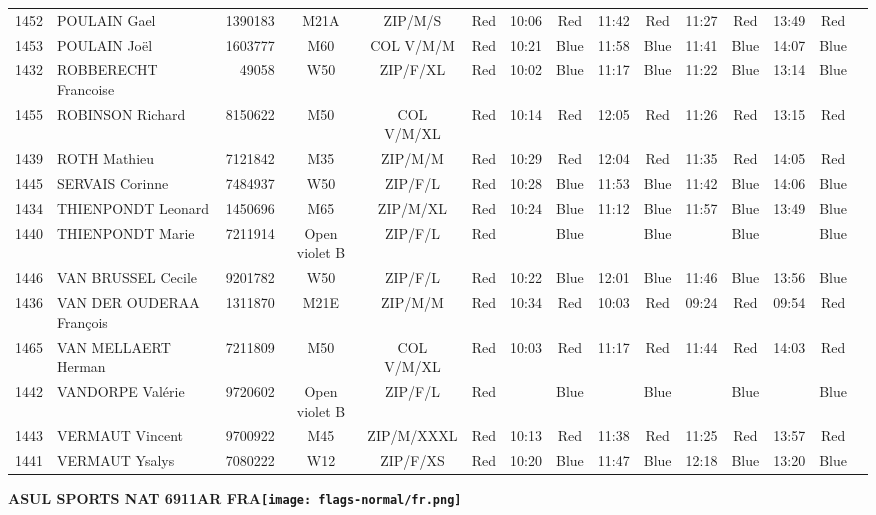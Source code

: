 \documentclass{report}
\begin{document}
\begin{longtable}{|c|l|r|c|c|*{5}{cc|}}
    1452 & POULAIN Gael & 1390183 & M21A & ZIP/M/S & Red & 10:06 & Red & 11:42 & Red & 11:27 & Red & 13:49 & Red &  \\
    1453 & POULAIN Joël & 1603777 & M60 & COL V/M/M & Red & 10:21 & Blue & 11:58 & Blue & 11:41 & Blue & 14:07 & Blue &  \\
    1432 & ROBBERECHT Francoise & 49058 & W50 & ZIP/F/XL & Red & 10:02 & Blue & 11:17 & Blue & 11:22 & Blue & 13:14 & Blue &  \\
    1455 & ROBINSON Richard & 8150622 & M50 & COL V/M/XL & Red & 10:14 & Red & 12:05 & Red & 11:26 & Red & 13:15 & Red &  \\
    1439 & ROTH Mathieu & 7121842 & M35 & ZIP/M/M & Red & 10:29 & Red & 12:04 & Red & 11:35 & Red & 14:05 & Red &  \\
    1445 & SERVAIS Corinne & 7484937 & W50 & ZIP/F/L & Red & 10:28 & Blue & 11:53 & Blue & 11:42 & Blue & 14:06 & Blue &  \\
    1434 & THIENPONDT Leonard & 1450696 & M65 & ZIP/M/XL & Red & 10:24 & Blue & 11:12 & Blue & 11:57 & Blue & 13:49 & Blue &  \\
    1440 & THIENPONDT Marie & 7211914 & Open violet B & ZIP/F/L & Red &   & Blue &   & Blue &   & Blue &   & Blue &  \\
    1446 & VAN BRUSSEL Cecile & 9201782 & W50 & ZIP/F/L & Red & 10:22 & Blue & 12:01 & Blue & 11:46 & Blue & 13:56 & Blue &  \\
    1436 & VAN DER OUDERAA François & 1311870 & M21E & ZIP/M/M & Red & 10:34 & Red & 10:03 & Red & 09:24 & Red & 09:54 & Red &  \\
    1465 & VAN MELLAERT Herman & 7211809 & M50 & COL V/M/XL & Red & 10:03 & Red & 11:17 & Red & 11:44 & Red & 14:03 & Red &  \\
    1442 & VANDORPE Valérie & 9720602 & Open violet B & ZIP/F/L & Red &   & Blue &   & Blue &   & Blue &   & Blue &  \\
    1443 & VERMAUT Vincent & 9700922 & M45 & ZIP/M/XXXL & Red & 10:13 & Red & 11:38 & Red & 11:25 & Red & 13:57 & Red &  \\
    1441 & VERMAUT Ysalys & 7080222 & W12 & ZIP/F/XS & Red & 10:20 & Blue & 11:47 & Blue & 12:18 & Blue & 13:20 & Blue &  \\
  \end{longtable}
\newpage
  \Huge \centering \bfseries ASUL SPORTS NAT 6911AR FRA\normalfont \footnotesize \sffamily \hfill \texttt{[image: flags-normal/fr.png]} \newline 
\end{document}
